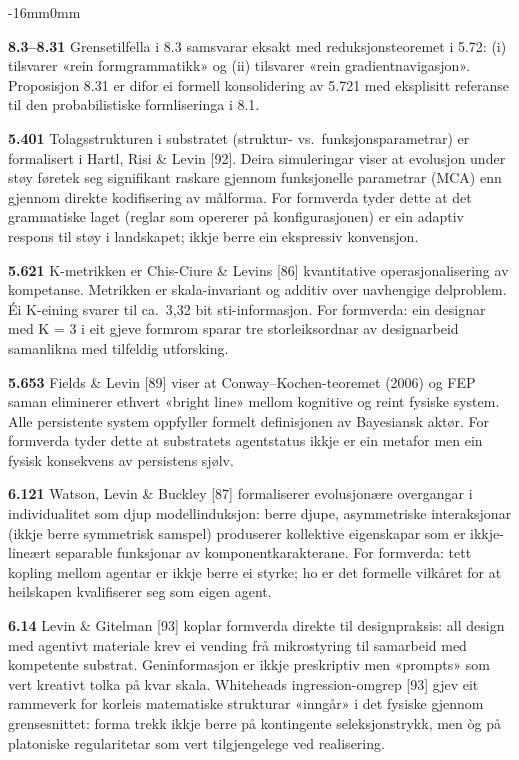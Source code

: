 \documentclass[10pt,oneside]{book}
\newenvironment{widebody}{%
  \begin{adjustwidth}{-16mm}{0mm}%
}{%
  \end{adjustwidth}%
}
\begin{document}
\begin{widebody}
{\textbf{8.3--8.31} Grensetilfella i 8.3 samsvarar eksakt med reduksjonsteoremet i 5.72: (i) tilsvarer «rein formgrammatikk» og (ii) tilsvarer «rein gradientnavigasjon». Proposisjon 8.31 er difor ei formell konsolidering av 5.721 med eksplisitt referanse til den probabilistiske formliseringa i 8.1.

\textbf{5.401} Tolagsstrukturen i substratet (struktur- vs.\ funksjonsparametrar) er formalisert i Hartl, Risi \& Levin [92]. Deira simuleringar viser at evolusjon under støy føretek seg signifikant raskare gjennom funksjonelle parametrar (MCA) enn gjennom direkte kodifisering av målforma. For formverda tyder dette at det grammatiske laget (reglar som opererer på konfigurasjonen) er ein adaptiv respons til støy i landskapet; ikkje berre ein ekspressiv konvensjon.

\textbf{5.621} K-metrikken er Chis-Ciure \& Levins [86] kvantitative operasjonalisering av kompetanse. Metrikken er skala-invariant og additiv over uavhengige delproblem. Éi K-eining svarer til ca.\ 3,32 bit sti-informasjon. For formverda: ein designar med K = 3 i eit gjeve formrom sparar tre storleiksordnar av designarbeid samanlikna med tilfeldig utforsking.

\textbf{5.653} Fields \& Levin [89] viser at Conway--Kochen-teoremet (2006) og FEP saman eliminerer ethvert «bright line» mellom kognitive og reint fysiske system. Alle persistente system oppfyller formelt definisjonen av Bayesiansk aktør. For formverda tyder dette at substratets agentstatus ikkje er ein metafor men ein fysisk konsekvens av persistens sjølv.

\textbf{6.121} Watson, Levin \& Buckley [87] formaliserer evolusjonære overgangar i individualitet som djup modellinduksjon: berre djupe, asymmetriske interaksjonar (ikkje berre symmetrisk samspel) produserer kollektive eigenskapar som er ikkje-lineært separable funksjonar av komponentkarakterane. For formverda: tett kopling mellom agentar er ikkje berre ei styrke; ho er det formelle vilkåret for at heilskapen kvalifiserer seg som eigen agent.

\textbf{6.14} Levin \& Gitelman [93] koplar formverda direkte til designpraksis: all design med agentivt materiale krev ei vending frå mikrostyring til samarbeid med kompetente substrat. Geninformasjon er ikkje preskriptiv men «prompts» som vert kreativt tolka på kvar skala. Whiteheads ingression-omgrep [93] gjev eit rammeverk for korleis matematiske strukturar «inngår» i det fysiske gjennom grensesnittet: forma trekk ikkje berre på kontingente seleksjonstrykk, men òg på platoniske regularitetar som vert tilgjengelege ved realisering.

}
\end{widebody}
\end{document}
